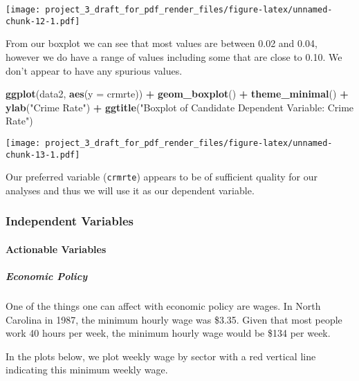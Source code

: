 \documentclass[]{article}
\newenvironment{Shaded}{\begin{snugshade}}{\end{snugshade}}
\newcommand{\DataTypeTok}[1]{\textcolor[rgb]{0.13,0.29,0.53}{#1}}
\newcommand{\KeywordTok}[1]{\textcolor[rgb]{0.13,0.29,0.53}{\textbf{#1}}}
\newcommand{\NormalTok}[1]{#1}
\newcommand{\OperatorTok}[1]{\textcolor[rgb]{0.81,0.36,0.00}{\textbf{#1}}}
\newcommand{\StringTok}[1]{\textcolor[rgb]{0.31,0.60,0.02}{#1}}
\let\oldparagraph\paragraph
\renewcommand{\paragraph}[1]{\oldparagraph{#1}\mbox{}}
\let\oldsubparagraph\subparagraph
\renewcommand{\subparagraph}[1]{\oldsubparagraph{#1}\mbox{}}
\begin{document}
\texttt{[image: project\_3\_draft\_for\_pdf\_render\_files/figure-latex/unnamed-chunk-12-1.pdf]}

From our boxplot we can see that most values are between 0.02 and 0.04,
however we do have a range of values including some that are close to
0.10. We don't appear to have any spurious values.

\begin{Shaded}
\begin{Highlighting}[]
\KeywordTok{ggplot}\NormalTok{(data2, }\KeywordTok{aes}\NormalTok{(}\DataTypeTok{y =}\NormalTok{ crmrte)) }\OperatorTok{+}
\StringTok{  }\KeywordTok{geom_boxplot}\NormalTok{() }\OperatorTok{+}
\StringTok{  }\KeywordTok{theme_minimal}\NormalTok{() }\OperatorTok{+}
\StringTok{  }\KeywordTok{ylab}\NormalTok{(}\StringTok{"Crime Rate"}\NormalTok{) }\OperatorTok{+}
\StringTok{  }\KeywordTok{ggtitle}\NormalTok{(}\StringTok{"Boxplot of Candidate Dependent Variable: Crime Rate"}\NormalTok{)}
\end{Highlighting}
\end{Shaded}

\texttt{[image: project\_3\_draft\_for\_pdf\_render\_files/figure-latex/unnamed-chunk-13-1.pdf]}

Our preferred variable (\texttt{crmrte}) appears to be of sufficient
quality for our analyses and thus we will use it as our dependent
variable.

\hypertarget{independent-variables}{%
\subsubsection{Independent Variables}\label{independent-variables}}

\hypertarget{actionable-variables-1}{%
\paragraph{Actionable Variables}\label{actionable-variables-1}}

\hypertarget{economic-policy-1}{%
\subparagraph{Economic Policy}\label{economic-policy-1}}

One of the things one can affect with economic policy are wages. In
North Carolina in 1987, the minimum hourly wage was \$3.35. Given that
most people work 40 hours per week, the minimum hourly wage would be
\$134 per week.

In the plots below, we plot weekly wage by sector with a red vertical
line indicating this minimum weekly wage.
\end{document}
